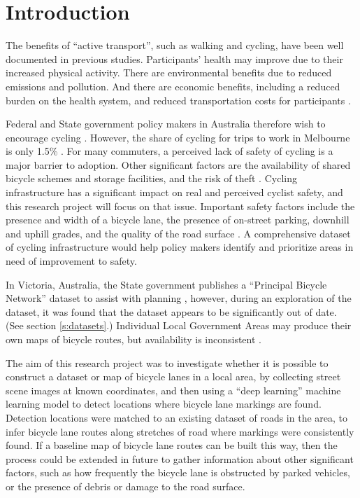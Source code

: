 \documentclass[11pt,twoside]{report}
\begin{document}

\tableofcontents
\listoffigures
\listoftables


\chapter{Introduction}


The benefits of ``active transport'', such as walking and cycling, have been well documented in previous studies.  Participants' health may improve due to their increased physical activity.  There are environmental benefits due to reduced emissions and pollution.  And there are economic benefits, including a reduced burden on the health system, and reduced transportation costs for participants \cite{LEE2012219} \cite{RABL2012121}.

Federal and State government policy makers in Australia therefore wish to encourage cycling \cite{federal_policy_2019} \cite{state_policy_2020}.  However, the share of cycling for trips to work in Melbourne is only 1.5\% \cite{melbactive}.  For many commuters, a perceived lack of safety of cycling is a major barrier to adoption.  Other significant factors are the availability of shared bicycle schemes and storage facilities, and the risk of theft \cite{WILSON2018234}.  Cycling infrastructure has a significant impact on real and perceived cyclist safety, and this research project will focus on that issue.  Important safety factors include the presence and width of a bicycle lane, the presence of on-street parking, downhill and uphill grades, and the quality of the road surface \cite{BIKESAFETY} \cite{Teschke2012}.  A comprehensive dataset of cycling infrastructure would help policy makers identify and prioritize areas in need of improvement to safety.

In Victoria, Australia, the State government publishes a ``Principal Bicycle Network'' dataset to assist with planning \cite{PrincipalBicycleNetwork}, however, during an exploration of the dataset, it was found that the dataset appears to be significantly out of date.   (See section \ref{s:datasets}.)  Individual Local Government Areas may produce their own maps of bicycle routes, but availability is inconsistent \cite{vicroads_maps}.

The aim of this research project was to investigate whether it is possible to construct a dataset or map of bicycle lanes in a local area, by collecting street scene images at known coordinates, and then using a ``deep learning'' machine learning model to detect locations where bicycle lane markings are found.  Detection locations were matched to an existing dataset of roads in the area, to infer bicycle lane routes along stretches of road where markings were consistently found.  If a baseline map of bicycle lane routes can be built this way, then the process could be extended in future to gather information about other significant factors, such as how frequently the bicycle lane is obstructed by parked vehicles, or the presence of debris or damage to the road surface.
\end{document}
